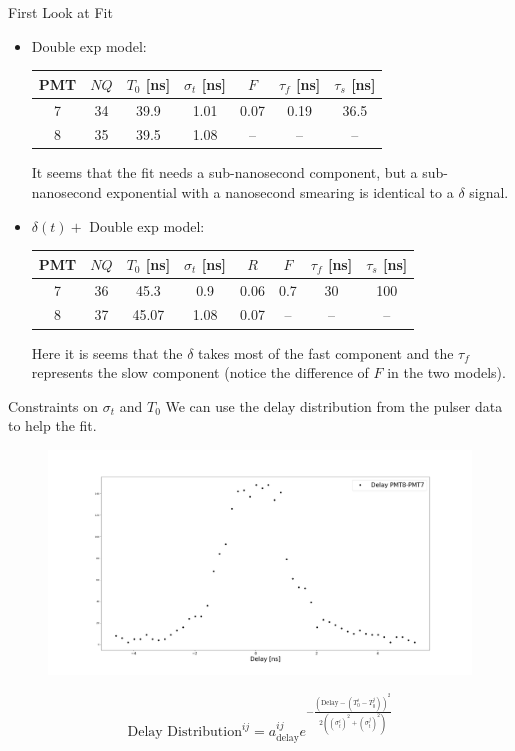 \documentclass{beamer}
\begin{document}
\begin{frame}{First Look at Fit}
\begin{itemize}

\item Double exp model:
\begin{center}
\begin{tabular}{|c||c|c|c|c|c|c|} 
\hline
PMT & $NQ$ & $T_0$ [ns]& $\sigma_t$ [ns] & $F$ & $\tau_f$ [ns] & $\tau_s$ [ns]\\ 
\hline\hline
7 & 34 & 39.9 & 1.01 & 0.07 & 0.19 & 36.5 \\
\hline
8 & 35 & 39.5 & 1.08 & -- & -- & -- \\
\hline
\end{tabular}
\end{center} 
It seems that the fit needs a sub-nanosecond component, but a sub-nanosecond exponential with a nanosecond smearing is identical to a $\delta$ signal.


\item $\delta(t)+$ Double exp model:
\begin{center}
\begin{tabular}{|c||c|c|c|c|c|c|c|} 
\hline
PMT & $NQ$ & $T_0$ [ns]& $\sigma_t$ [ns] & $R$ & $F$ & $\tau_f$ [ns] & $\tau_s$ [ns]\\ 
\hline\hline
7 & 36 & 45.3 & 0.9 & 0.06 & 0.7 & 30 & 100 \\
\hline
8 & 37 & 45.07 & 1.08 & 0.07 & -- & -- & -- \\
\hline
\end{tabular}
\end{center} 
Here it is seems that the $\delta$ takes most of the fast component and the $\tau_f$  represents the slow component (notice the difference of $F$ in the two models).
\end{itemize}

\end{frame}

\begin{frame}{Constraints on $\sigma_t$ and $T_0$}
We can use the delay distribution from the pulser data to help the fit.
\begin{figure}[h]
\includegraphics[width=1\textwidth]{model_delay.png}
\end{figure}
\begin{equation}
\text{Delay Distribution}^{ij}=a_{\text{delay}}^{ij}e^{-\frac{\left(\text{Delay}-(T_0^i-T_0^j)\right)^2}{2\left((\sigma_t^i)^2+(\sigma_t^j)^2\right)}}
\end{equation}
\end{frame}
\end{document}
